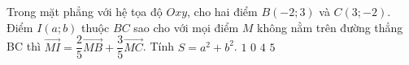 \begin{ex}%
	Trong mặt phẳng với hệ tọa độ $Oxy$, cho hai điểm $B(-2;3)$ và $C(3;-2)$. Điểm $I(a;b)$ thuộc $BC$ sao cho với mọi điểm $M$ không nằm trên đường thẳng BC thì $\vec{MI}=\dfrac{2}{5}\vec{MB}+\dfrac{3}{5}\vec{MC}$. Tính $S=a^2+b^2$.
	\choice
	{\True $1$}
	{$0$}
	{$4$}
	{$5$}
\end{ex}
